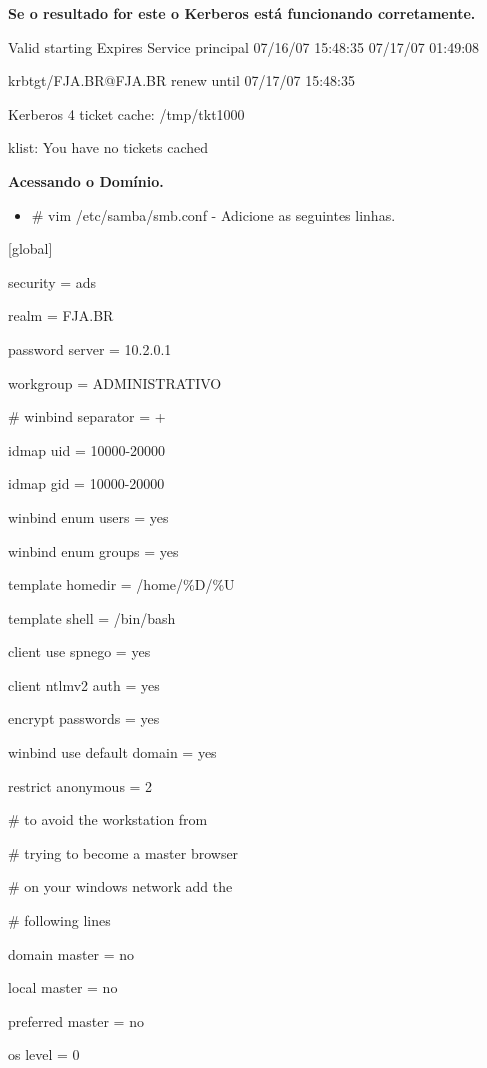 \textbf {Se o resultado for este o Kerberos está funcionando corretamente.}

	Valid starting Expires Service principal 07/16/07 15:48:35  07/17/07 01:49:08  

	krbtgt/FJA.BR@FJA.BR renew until 07/17/07 15:48:35
	
	Kerberos 4 ticket cache: /tmp/tkt1000
	
	klist: You have no tickets cached

\textbf{Acessando o Domínio.}

\begin{itemize}
	\item {\# vim /etc/samba/smb.conf} -  Adicione as seguintes linhas.
\end{itemize}

[global]

        security = ads

        realm = FJA.BR

        password server = 10.2.0.1

        workgroup = ADMINISTRATIVO

\#       winbind separator = +

        idmap uid = 10000-20000

        idmap gid = 10000-20000

        winbind enum users = yes

        winbind enum groups = yes

        template homedir = /home/\%D/\%U

        template shell = /bin/bash

        client use spnego = yes

        client ntlmv2 auth = yes

        encrypt passwords = yes

        winbind use default domain = yes

        restrict anonymous = 2

\# to avoid the workstation from

\# trying to become a master browser

\# on your windows network add the

\# following lines

        domain master = no

        local master = no

        preferred master = no

        os level = 0

